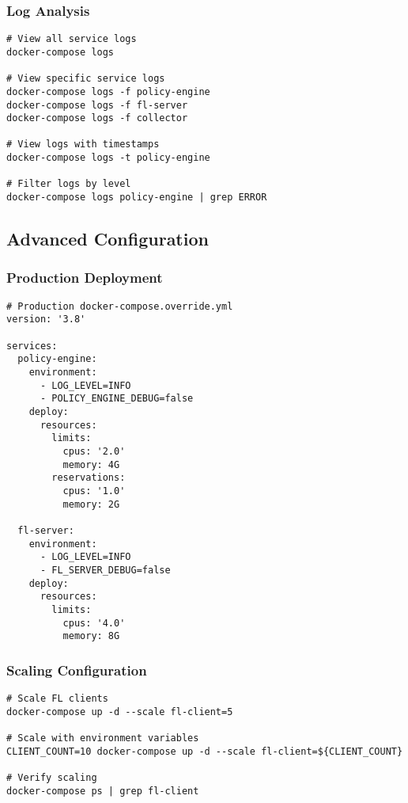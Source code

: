 \subsubsection{Log Analysis}

\begin{lstlisting}[style=bashcode, caption=Log Analysis Commands]
# View all service logs
docker-compose logs

# View specific service logs
docker-compose logs -f policy-engine
docker-compose logs -f fl-server
docker-compose logs -f collector

# View logs with timestamps
docker-compose logs -t policy-engine

# Filter logs by level
docker-compose logs policy-engine | grep ERROR
\end{lstlisting}

\subsection{Advanced Configuration}

\subsubsection{Production Deployment}

\begin{lstlisting}[style=dockercode, caption=Production Configuration]
# Production docker-compose.override.yml
version: '3.8'

services:
  policy-engine:
    environment:
      - LOG_LEVEL=INFO
      - POLICY_ENGINE_DEBUG=false
    deploy:
      resources:
        limits:
          cpus: '2.0'
          memory: 4G
        reservations:
          cpus: '1.0'
          memory: 2G

  fl-server:
    environment:
      - LOG_LEVEL=INFO
      - FL_SERVER_DEBUG=false
    deploy:
      resources:
        limits:
          cpus: '4.0'
          memory: 8G
\end{lstlisting}

\subsubsection{Scaling Configuration}

\begin{lstlisting}[style=bashcode, caption=Horizontal Scaling]
# Scale FL clients
docker-compose up -d --scale fl-client=5

# Scale with environment variables
CLIENT_COUNT=10 docker-compose up -d --scale fl-client=${CLIENT_COUNT}

# Verify scaling
docker-compose ps | grep fl-client
\end{lstlisting}

